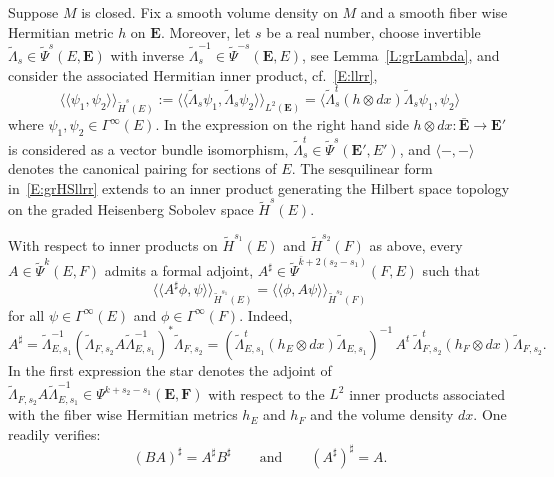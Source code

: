 \documentclass[reqno,12pt]{amsart}
\newcommand\llangle{\langle\!\langle}
\newcommand\rrangle{\rangle\!\rangle}
\theoremstyle{plain}
\theoremstyle{definition}
\begin{document}
Suppose $M$ is closed.
Fix a smooth volume density on $M$ and a smooth fiber wise Hermitian metric $h$ on $\mathbf E$.
Moreover, let $s$ be a real number, choose invertible $\tilde\Lambda_s\in\tilde\Psi^s(E,\mathbf E)$ with inverse $\tilde\Lambda_s^{-1}\in\tilde\Psi^{-s}(\mathbf E,E)$, see Lemma~\ref{L:grLambda}, and consider the associated Hermitian inner product, cf.~\eqref{E:llrr},
\begin{equation}\label{E:grHSllrr}
\llangle\psi_1,\psi_2\rrangle_{\tilde H^s(E)}
:=\llangle\tilde\Lambda_s\psi_1,\tilde\Lambda_s\psi_2\rrangle_{L^2(\mathbf E)}
=\langle\tilde\Lambda_s^t(h\otimes dx)\tilde\Lambda_s\psi_1,\psi_2\rangle
\end{equation}
where $\psi_1,\psi_2\in\Gamma^\infty(E)$.
In the expression on the right hand side $h\otimes dx\colon\bar{\mathbf E}\to\mathbf E'$ is considered as a vector bundle isomorphism, $\tilde\Lambda_s^t\in\tilde\Psi^s(\mathbf E',E')$, and $\langle-,-\rangle$ denotes the canonical pairing for sections of $E$.
The sesquilinear form in~\eqref{E:grHSllrr} extends to an inner product generating the Hilbert space topology on the graded Heisenberg Sobolev space $\tilde H^s(E)$.


With respect to inner products on $\tilde H^{s_1}(E)$ and $\tilde H^{s_2}(F)$ as above, every $A\in\tilde\Psi^k(E,F)$ admits a formal adjoint, $A^\sharp\in\tilde\Psi^{\bar k+2(s_2-s_1)}(F,E)$ such that
\begin{equation}\label{E:Asharpllrr}
\llangle A^\sharp\phi,\psi\rrangle_{\tilde H^{s_1}(E)}=\llangle\phi,A\psi\rrangle_{\tilde H^{s_2}(F)}
\end{equation}
for all $\psi\in\Gamma^\infty(E)$ and $\phi\in\Gamma^\infty(F)$.
Indeed,
\begin{equation}\label{E:Asharp}
A^\sharp
=\tilde\Lambda_{E,s_1}^{-1}(\tilde\Lambda_{F,s_2}A\tilde\Lambda_{E,s_1}^{-1})^*\tilde\Lambda_{F,s_2}
=(\tilde\Lambda_{E,s_1}^t(h_E\otimes dx)\tilde\Lambda_{E,s_1})^{-1}\,A^t\,\tilde\Lambda_{F,s_2}^t(h_F\otimes dx)\tilde\Lambda_{F,s_2}.
\end{equation}
In the first expression the star denotes the adjoint of $\tilde\Lambda_{F,s_2}A\tilde\Lambda_{E,s_1}^{-1}\in\Psi^{k+s_2-s_1}(\mathbf E,\mathbf F)$ with respect to the $L^2$ inner products associated with the fiber wise Hermitian metrics $h_E$ and $h_F$ and the volume density $dx$.
One readily verifies:
\begin{equation}\label{E:BAsharp}
(BA)^\sharp=A^\sharp B^\sharp
\qquad\text{and}\qquad
(A^\sharp)^\sharp=A.
\end{equation}
\end{document}
